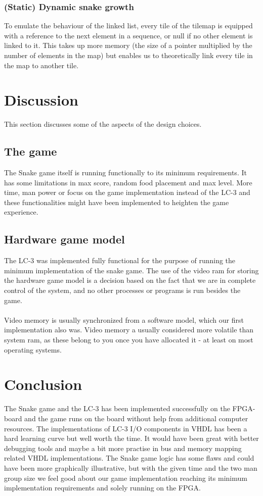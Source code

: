 \documentclass{acm_proc_article-sp}
\begin{document}
\subsubsection{(Static) Dynamic snake growth}
To emulate the behaviour of the linked list, every tile of the tilemap is equipped with a reference to the next element in a sequence, or null if no other element is linked to it. This takes up more memory (the size of a pointer multiplied by the number of elements in the map) but enables us to theoretically link every tile in the map to another tile.

\section{Discussion}
This section discusses some of the aspects of the design choices.

\subsection{The game}
The Snake game itself is running functionally to its minimum requirements. 
It has some limitations in max score, random food placement and max level.
More time, man power or focus on the game implementation instead of the LC-3 and these functionalities might have been implemented to heighten the game experience.

\subsection{Hardware game model}
The LC-3 was implemented fully functional for the purpose of running the minimum implementation of the snake game.
The use of the video ram for storing the hardware game model is a decision based on the fact that we are in complete control of the system, and no other processes or programs is run besides the game.\\\\
Video memory is usually synchronized from a software model, which our first implementation also was. Video memory a usually considered more volatile than system ram, as these belong to you once you have allocated it - at least on most operating systems.


\section{Conclusion}
The Snake game and the LC-3 has been implemented successfully on the FPGA-board and the game runs on the board without help from additional computer resources. 
The implementations of LC-3 I/O components in VHDL has been a hard learning curve but well worth the time.
It would have been great with better debugging tools and maybe a bit more practise in bus and memory mapping related VHDL implementations.
The Snake game logic has some flaws and could have been more graphically illustrative, but with the given time and the two man group size we feel good about our game implementation reaching its minimum implementation requirements and solely running on the FPGA. 
\end{document}
